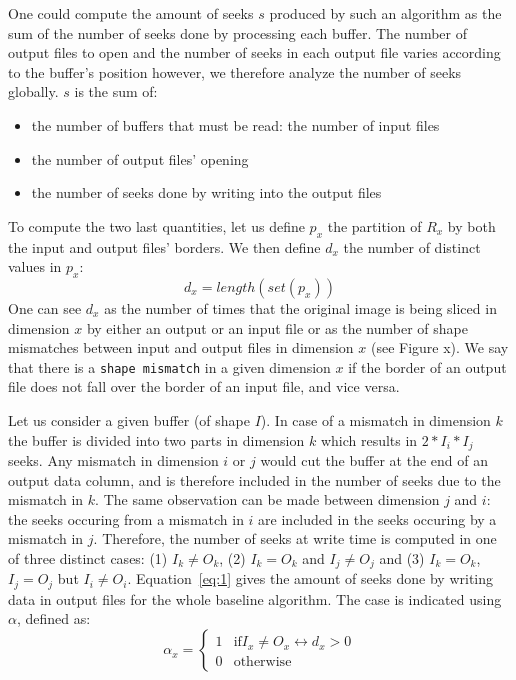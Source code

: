 \documentclass[conference]{IEEEtran}
\begin{document}
One could compute the amount of seeks $s$ produced by such an algorithm as the
sum of the number of seeks done by processing each buffer. The number of output
files to open and the number of seeks in each output file varies
according to the buffer's position however, we therefore analyze the number of
seeks globally. $s$ is the sum of:
\begin{itemize}
  \item the number of buffers that must be read: the number of input files
  \item the number of output files' opening
  \item the number of seeks done by writing into the output files
\end{itemize}

To compute the two last quantities, let us define $p_x$ the partition of $R_x$
by both the input and output files' borders. We then define $d_x$ the number of
distinct values in $p_x$:
$$d_x=length(set(p_x))$$
One can see $d_x$ as the number of times that the original image is being sliced
in dimension $x$ by either an output or an input file or as the number of shape
mismatches between input and output files in dimension $x$ (see Figure x).
We say that there is a \texttt{shape mismatch} in a given dimension $x$ if
the border of an output file does not fall over the border of an input file, and
vice versa.

Let us consider a given buffer (of shape $I$). In case of a mismatch in
dimension $k$ the buffer is divided into two parts in dimension $k$ which results
in  $2*I_i*I_j$ seeks. Any mismatch in dimension $i$ or $j$ would cut the
buffer at the end of an output data column, and is therefore included in
the number of seeks due to the mismatch in $k$. The same observation can be made
between dimension $j$ and $i$: the seeks occuring from a mismatch in $i$ are
included in the seeks occuring by a mismatch in $j$. Therefore, the number of
seeks at write time is computed in one of three distinct cases:
(1) $I_k \neq O_k$, (2) $I_k = O_k$ and $I_j \neq O_j$ and (3) $I_k = O_k$,
$I_j = O_j$ but $I_i \neq O_i$. Equation~\ref{eq:1} gives the amount of seeks
done by writing data in output files for the whole baseline algorithm.
The case is indicated using $\alpha$, defined as: \\
$$\alpha_x = \begin{cases}
   1 & \mathrm{if} I_x \neq O_x \leftrightarrow d_x > 0 \\
   0 & \mathrm{otherwise}
\end{cases}$$
\end{document}
